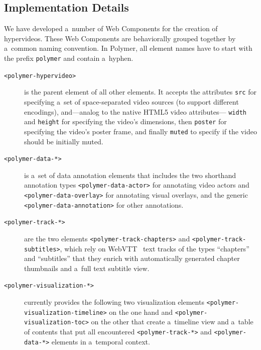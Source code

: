 \documentclass[runningheads,a4paper]{llncs}
\begin{document}
\subsection{Implementation Details}

We have developed a~number of Web Components for the creation of hypervideos.
These Web Components are behaviorally grouped together
by a~common naming convention.
In Polymer, all element names have to start with the prefix \texttt{polymer} and contain a~hyphen.

\begin{description}
  \item[\texttt{<polymer-hypervideo>}] is the parent element of all other elements.
    It accepts the attributes \texttt{src} for specifying a~set of
    space-separated video sources (to support different encodings),
    and---analog to the native HTML5 video attributes---%
    \texttt{width} and \texttt{height} for specifying the video's dimensions,
    then \texttt{poster} for specifying the video's poster frame, and finally \texttt{muted} to specify if the video should be initially muted.
  \item[\texttt{<polymer-data-*>}] is a~set of data annotation elements
    that includes the two shorthand annotation types
    \texttt{<polymer-data-actor>} for annotating video actors and
    \texttt{<polymer-data-overlay>} for annotating visual overlays,
    and the generic \texttt{<polymer-data-annotation>} for other annotations.
  \item[\texttt{<polymer-track-*>}] are the two elements
    \texttt{<polymer-track-chapters>} and \texttt{<polymer-track-subtitles>},
    which rely on WebVTT~\cite{pfeiffer2013webvtt} text tracks
    of the types ``chapters'' and ``subtitles'' that they enrich with
    automatically generated chapter thumbnails and a~full text subtitle view.
  \item[\texttt{<polymer-visualization-*>}] currently provides the
    following two visualization elements
    \texttt{<polymer-visualization-timeline>} on the one hand and 
    \texttt{<polymer-visualization-toc>} on the other
    that create a~timeline view and a~table of contents
    that put all encountered \texttt{<polymer-track-*>}
    and \texttt{<polymer-data-*>} elements in a~temporal context.
\end{description}
\end{document}

